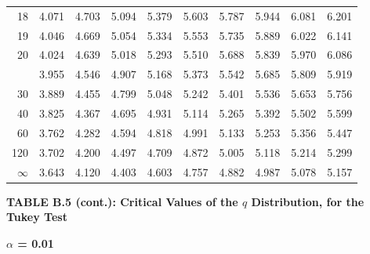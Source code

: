 \documentclass[10pt]{article}
\begin{document}
\begin{longtable}{@{}r!{\vrule width 0.8pt\hspace{0.55em}}rrrrrrrrr@{}}
18 & 4.071 & 4.703 & 5.094 & 5.379 & 5.603 & 5.787 & 5.944 & 6.081 & 6.201 \\
19 & 4.046 & 4.669 & 5.054 & 5.334 & 5.553 & 5.735 & 5.889 & 6.022 & 6.141 \\
20 & 4.024 & 4.639 & 5.018 & 5.293 & 5.510 & 5.688 & 5.839 & 5.970 & 6.086 \\
 & 3.955 & 4.546 & 4.907 & 5.168 & 5.373 & 5.542 & 5.685 & 5.809 & 5.919 \\
30 & 3.889 & 4.455 & 4.799 & 5.048 & 5.242 & 5.401 & 5.536 & 5.653 & 5.756 \\
40 & 3.825 & 4.367 & 4.695 & 4.931 & 5.114 & 5.265 & 5.392 & 5.502 & 5.599 \\
60 & 3.762 & 4.282 & 4.594 & 4.818 & 4.991 & 5.133 & 5.253 & 5.356 & 5.447 \\
120 & 3.702 & 4.200 & 4.497 & 4.709 & 4.872 & 5.005 & 5.118 & 5.214 & 5.299 \\
\addlinespace[0.30em]
$\infty$ & 3.643 & 4.120 & 4.403 & 4.603 & 4.757 & 4.882 & 4.987 & 5.078 & 5.157 \\
\end{longtable}
\newpage
\thispagestyle{empty}
\begin{center}
{\large\bfseries TABLE B.5 (cont.): Critical Values of the $q$ Distribution, for the Tukey Test\par}
\end{center}
{\large\bfseries $\alpha$ = 0.01\par}
\vspace{0.45em}
\small
\end{document}
